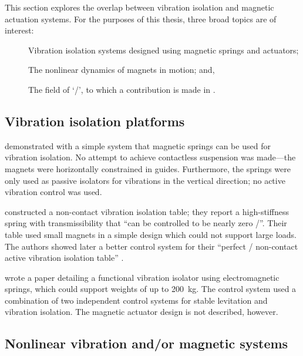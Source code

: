 \documentclass[11pt,a4paper]{memoir}
\begin{document}
This section explores the overlap between vibration isolation and magnetic actuation systems.
For the purposes of this thesis, three broad topics are of interest:
\begin{description}
\item[]
Vibration isolation systems designed using magnetic springs and actuators;
\item[]
The nonlinear dynamics of magnets in motion; and,
\item[]
The field of `\qzs/', to which a contribution is made in .
\end{description}

\subsection{Vibration isolation platforms}

\textcite{puppin2002} demonstrated with a simple system that magnetic springs can be used for vibration isolation. No attempt to achieve contactless suspension was made—the magnets were horizontally constrained in guides.
Furthermore, the springs were only used as passive isolators for vibrations in the vertical direction; no active vibration control was used.

\textcite{nagaya1993} constructed a non-contact vibration isolation table; they report a high-stiffness spring with transmissibility that \enquote{can be controlled to be nearly zero \sic/}.
Their table used small magnets in a simple design which could not support large loads.
The authors showed later a better control system for their \enquote{perfect \sic/
non-contact active vibration isolation table} \cite{nagaya1995a}.

\textcite{watanabe1996} wrote a paper detailing a functional vibration isolator using electromagnetic springs, which could support weights of up to
\SI{200}{kg}.
The control system used a combination of two independent control systems for stable levitation and vibration isolation.
The magnetic actuator design is not described, however.



\subsection{Nonlinear vibration and/or magnetic systems}
\end{document}
